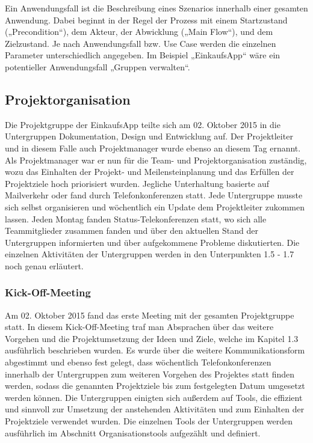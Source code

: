 \documentclass[12pt,a4paper]{article}
\begin{document}
Ein Anwendungsfall ist die Beschreibung eines Szenarios innerhalb einer gesamten Anwendung. Dabei beginnt in der Regel der Prozess mit einem Startzustand („Precondition“), dem Akteur, der Abwicklung („Main Flow“), und dem Zielzustand. Je nach Anwendungsfall bzw. Use Case werden die einzelnen Parameter unterschiedlich angegeben. 
Im Beispiel „EinkaufsApp“ wäre ein potentieller Anwendungsfall „Gruppen verwalten“. 


\newpage
\subsection{Projektorganisation}
Die Projektgruppe der EinkaufsApp teilte sich am 02. Oktober 2015 in die Untergruppen Dokumentation, Design und Entwicklung auf.
Der Projektleiter und in diesem Falle auch Projektmanager wurde ebenso an diesem Tag ernannt.
Als Projektmanager war er nun für die Team- und Projektorganisation zuständig, wozu das Einhalten der Projekt- und Meilensteinplanung  und das Erfüllen der Projektziele hoch priorisiert wurden.
Jegliche Unterhaltung basierte auf Mailverkehr oder fand durch Telefonkonferenzen statt. Jede Untergruppe musste sich selbst organisieren und wöchentlich ein Update dem Projektleiter zukommen lassen. Jeden Montag fanden Status-Telekonferenzen statt, wo sich alle Teammitglieder zusammen fanden und über den aktuellen Stand der Untergruppen informierten und über aufgekommene Probleme diskutierten. Die einzelnen Aktivitäten der Untergruppen werden in den Unterpunkten  1.5 - 1.7 noch genau erläutert.


\subsubsection{Kick-Off-Meeting}
Am 02. Oktober  2015 fand das erste Meeting mit der gesamten Projektgruppe statt. In diesem Kick-Off-Meeting traf man Absprachen über das weitere Vorgehen und die Projektumsetzung der Ideen und Ziele, welche im Kapitel 1.3 ausführlich beschrieben wurden. Es wurde über die weitere Kommunikationsform abgestimmt und ebenso fest gelegt, dass wöchentlich Telefonkonferenzen innerhalb der Untergruppen zum weiteren Vorgehen des Projektes statt finden werden, sodass die genannten Projektziele bis zum festgelegten Datum umgesetzt werden können. 
Die Untergruppen einigten sich außerdem auf Tools, die effizient und sinnvoll zur Umsetzung der anstehenden Aktivitäten und zum Einhalten der Projektziele verwendet wurden. Die einzelnen Tools der Untergruppen werden ausführlich im Abschnitt Organisationstools aufgezählt und definiert.
\newpage
\end{document}
